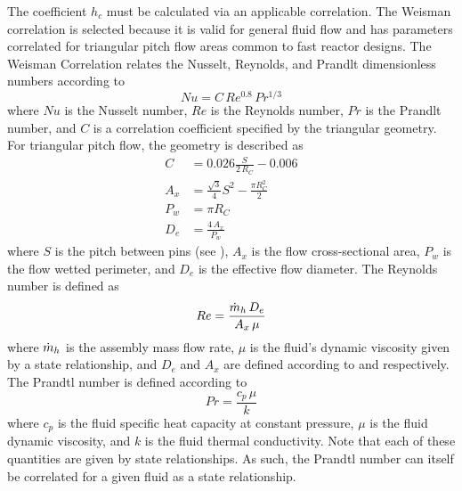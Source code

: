       The coefficient $h_c$ must be calculated via an applicable correlation.
      The Weisman correlation is selected because it is valid for general fluid
      flow and has parameters correlated for triangular pitch flow areas common
      to fast reactor designs. The Weisman Correlation relates the Nusselt,
      Reynolds, and Prandlt dimensionless numbers according to
      \begin{equation}
        \label{eq:weisman}
        Nu = C \, Re^{0.8} \, Pr^{1/3}
      \end{equation}
      where $Nu$ is the Nusselt number, $Re$ is the Reynolds number, $Pr$ is 
      the Prandlt number, and $C$ is a correlation coefficient specified by the
      triangular geometry. For triangular pitch flow, the geometry is described
      as
      \begin{align}
        \label{eq:weisman_c}
        C &= 0.026 \frac{S}{2 \, R_C} - 0.006 \\
        \label{eq:weisman_ax}
        A_x &= \frac{\sqrt{3}}{4} S^2 - \frac{\pi R_C^2}{2} \\
        \label{eq:weisman_pw}
        P_w &= \pi R_C \\
        \label{eq:weisman_de}
        D_e &= \frac{4 \, A_x}{P_w}
      \end{align}
      where $S$ is the pitch between pins (see ), $A_x$ is the
      flow cross-sectional area, $P_w$ is the flow wetted perimeter, and $D_e$
      is the effective flow diameter. The Reynolds number is defined as
      \begin{equation}
        \label{eq:re}
        Re = \frac{\dot{m}_h \, D_e}{A_x \, \mu}
      \end{equation}
      where $\dot{m}_h$ is the assembly mass flow rate, $\mu$ is the fluid's
      dynamic viscosity given by a state relationship, and $D_e$ and $A_x$ are 
      defined according to  and 
      respectively. The Prandtl number is defined according to 
      \begin{equation}
        \label{eq:pr}
        Pr = \frac{c_p \, \mu}{k}
      \end{equation}
      where $c_p$ is the fluid specific heat capacity at constant pressure, 
      $\mu$ is the fluid dynamic viscosity, and $k$ is the fluid thermal 
      conductivity. Note that each of these quantities are given by state 
      relationships. As such, the Prandtl number can itself be correlated for a
      given fluid as a state relationship.
      
